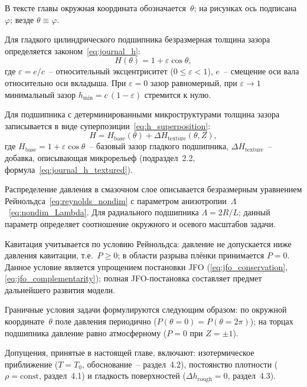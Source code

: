 В тексте главы окружная координата обозначается~$\theta$;
на рисунках ось подписана~$\varphi$; везде $\theta \equiv \varphi$.

Для гладкого цилиндрического подшипника безразмерная толщина
зазора определяется законом~\eqref{eq:journal_h}:
\begin{equation}
  H(\theta) = 1 + \varepsilon\cos\theta,
  \label{eq:journal_h_ch5}
\end{equation}
где $\varepsilon = e/c$~-- относительный эксцентриситет
($0 \leq \varepsilon < 1$), $e$~-- смещение оси вала
относительно оси вкладыша. При $\varepsilon = 0$ зазор
равномерный, при $\varepsilon \to 1$ минимальный зазор
$h_{\min} = c\,(1 - \varepsilon)$ стремится к нулю.

Для подшипника с детерминированными микроструктурами толщина
зазора записывается в виде суперпозиции~\eqref{eq:h_superposition}:
\begin{equation}
  H = H_{\mathrm{base}}(\theta) + \Delta H_{\mathrm{texture}}(\theta, Z),
  \label{eq:journal_h_tex_ch5}
\end{equation}
где $H_{\mathrm{base}} = 1 + \varepsilon\cos\theta$~-- базовый зазор
гладкого подшипника, $\Delta H_{\mathrm{texture}}$~-- добавка,
описывающая микрорельеф (подраздел~2.2, формула~\eqref{eq:journal_h_textured}).

Распределение давления в смазочном слое описывается безразмерным
уравнением Рейнольдса~\eqref{eq:reynolds_nondim} с параметром
анизотропии~$\Lambda$~\eqref{eq:nondim_Lambda}. Для радиального
подшипника $\Lambda = 2R/L$; данный параметр определяет
соотношение окружного и осевого масштабов задачи.

Кавитация учитывается по условию Рейнольдса: давление не допускается
ниже давления кавитации, т.е.\ $P \geq 0$; в области разрыва плёнки
принимается $P = 0$. Данное условие является упрощением постановки JFO
(\eqref{eq:jfo_conservation}, \eqref{eq:jfo_complementarity});
полная JFO-постановка составляет предмет дальнейшего развития модели.

Граничные условия задачи формулируются следующим образом:
по окружной координате~$\theta$ поле давления периодично
($P(\theta = 0) = P(\theta = 2\pi)$); на торцах подшипника
давление равно атмосферному ($P = 0$ при $Z = \pm 1$).

Допущения, принятые в настоящей главе, включают: изотермическое
приближение ($T = T_0$, обоснование~-- раздел~4.2), постоянство
плотности ($\rho = \mathrm{const}$, раздел~4.1) и гладкость
поверхностей ($\Delta h_{\mathrm{rough}} = 0$, раздел~4.3).

